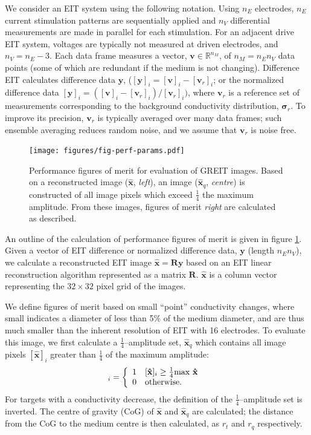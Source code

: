 \documentclass[12pt]{iopart}
\newcommand{\vB}{\mbox{$\mathbf{v}$}}
\newcommand{\xH}{\mbox{$\mathbf{\hat x}$}}
\newcommand{\yB}{\mbox{$\mathbf{y}$}}
\newcommand{\RB}{\mbox{$\mathbf{R}$}}
\newcommand{\sG}{\mbox{${\boldsymbol \sigma}$}}
\begin{document}
We consider an EIT system using the following notation.
Using $n_E$ electrodes,  $n_E$ current stimulation
patterns are sequentially applied and $n_V$ differential
measurements are made in parallel for each stimulation.
 For an adjacent drive
EIT system, voltages are typically not measured at driven
electrodes, and $n_V = n_E - 3$.  Each data frame measures
a vector, $\vB\in\mathbb{R}^{n_M}$, of $n_M= n_E n_V$ data points
(some of which are redundant if the medium is not changing).
Difference EIT calculates difference data $\yB$, ($[\yB]_i =
[\vB]_i - [\vB_r]_i$; or the normalized difference data $[\yB]_i
= ([\vB]_i - [\vB_r]_i)/[\vB_r]_i)$, where $\vB_r$ is a reference
set of measurements corresponding to the background conductivity
distribution, $\sG_r$. To improve its precision,
$\vB_r$ is typically averaged over many data frames; 
such ensemble averaging reduces random noise, and we
 assume that $\vB_r$ is noise free.



\begin{figure}[bhtp]
\begin{center}
\texttt{[image: figures/fig-perf-params.pdf]}
\caption{ \label{fig:PerfFigures}
Performance figures of merit for evaluation of GREIT images.
Based on a reconstructed image ($\xH$, {\em left}),
an image ($\xH_q$, {\em centre})
is constructed of all image pixels which exceed
 $\frac{1}{4}$ the maximum amplitude. From these images,
figures of merit {\em right} are calculated as described.
}
\end{center}
\end{figure}

An outline of the calculation of performance figures
of merit is given in figure \ref{fig:PerfFigures}.
Given a vector of EIT difference or normalized difference
data, $\yB$ (length $n_E n_V$), we calculate a 
reconstructed EIT image $\xH = \RB \yB$ based on
an EIT linear reconstruction algorithm represented as
a matrix $\RB$. $\xH$ is a column vector representing
the $32\times 32$ pixel grid of the images.

We define figures of merit based on small ``point''
conductivity changes, where small indicates a diameter
of less than 5\% of the medium diameter, and are thus
much smaller than the inherent resolution of EIT with
16 electrodes.
To evaluate this image, we first calculate
a $\frac{1}{4}$--amplitude set, $\xH_q$ which
contains all image pixels $[\xH]_i$ greater
than $\frac{1}{4}$ of the maximum amplitude:
\begin{equation}
[\xH_q]_i = \left\{ \begin{array}{ll}
    1 & [\xH]_i  \geq \mbox{$ \frac{1}{4}\mathrm{max}~\xH$ } \\
    0 & \mbox{otherwise}.
\end{array} \right.
\end{equation}
For targets
with a conductivity decrease, the definition
of the $\frac{1}{4}$--amplitude set is inverted.
The centre of gravity (CoG) of $\xH$ and $\xH_q$ are
calculated; the distance from the CoG to the 
medium centre is then calculated, as $r_t$ and $r_q$
respectively.
\end{document}
